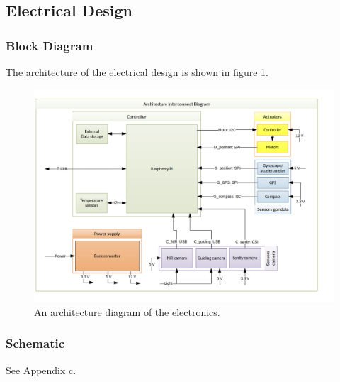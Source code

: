 \pagebreak
\subsection{Electrical Design}

\subsubsection{Block Diagram}
\label{sec:4.5.1}
The architecture of the electrical design is shown in figure \ref{fig:electronic-architecture}.

\begin{figure}[H]
	\centering
	\includegraphics[width=\textwidth]{4-experiment-design/img/electrical/ArchitectureInterconnect.png}
	\caption{An architecture diagram of the electronics.}
	\label{fig:electronic-architecture}
\end{figure}




\subsubsection{Schematic}
See Appendix c.

